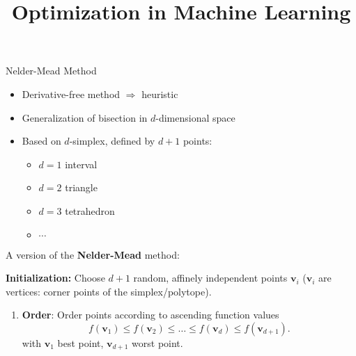 \documentclass[11pt,compress,t,notes=noshow, xcolor=table]{beamer}
\title{Optimization in Machine Learning}
\begin{document}

\begin{vbframe}{Nelder-Mead Method}

\begin{itemize}
    \item Derivative-free method $\Rightarrow$ heuristic
    \item Generalization of bisection in $d$-dimensional space
    \item Based on $d$-simplex, defined by $d + 1$ points:
        \begin{itemize}
            \small
            \item $d = 1$ interval
            \item $d = 2$ triangle
            \item $d = 3$ tetrahedron
            \item $\cdots$
        \end{itemize}
\end{itemize}

\framebreak

A version of the \textbf{Nelder-Mead} method:

\medskip

\textbf{Initialization:} Choose $d + 1$ random, affinely independent points $\mathbf{v}_i$ ($\mathbf{v}_i$ are vertices: corner points of the simplex/polytope).

\medskip

\begin{enumerate}
\item \textbf{Order}: Order points according to ascending function values
$$
f(\mathbf{v}_1) \leq f(\mathbf{v}_2) \leq \ldots \leq f(\mathbf{v}_d) \leq f(\mathbf{v}_{d + 1}).
$$
with $\mathbf{v}_1$ best point, $\mathbf{v}_{d + 1}$ worst point.


\end{enumerate}
\end{vbframe}
\end{document}
